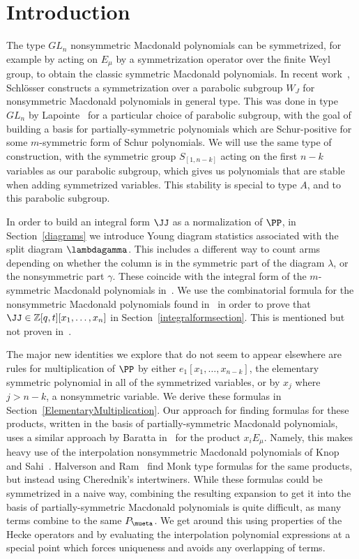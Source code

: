 \section{Introduction}
The type $GL_n$ nonsymmetric Macdonald polynomials can be symmetrized, for example by acting on $E_\mu$ by a symmetrization operator over the finite Weyl group, to obtain the classic symmetric Macdonald polynomials. In recent work~\cite{Schlosser}, Schl\"{o}sser constructs a symmetrization over a parabolic subgroup $W_J$ for nonsymmetric Macdonald polynomials in general type. This was done in type $GL_n$ by Lapointe~\cite{Lapointe} for a particular choice of parabolic subgroup, with the goal of building a basis for partially-symmetric polynomials which are Schur-positive for some $m$-symmetric form of Schur polynomials. We will use the same type of construction, with the symmetric group $S_{[1,n-k]}$ acting on the first $n-k$ variables as our parabolic subgroup, which gives us polynomials that are stable when adding symmetrized variables. This stability is special to type $A$, and to this parabolic subgroup.

In order to build an integral form $\JJ$ as a normalization of $\PP$, in Section~\ref{diagrams} we introduce Young diagram statistics associated with the split diagram $\lambdagamma$. This includes a different way to count arms depending on whether the column is in the symmetric part of the diagram $\lambda$, or the nonsymmetric part $\gamma$. These coincide with the integral form of the $m$-symmetric Macdonald polynomials in~\cite{Lapointe}. We use the combinatorial formula for the nonsymmetric Macdonald polynomials found in~\cite{MR2405160} in order to prove that $\JJ \in \mathbb{Z}[q,t][x_1, \dotsc, x_n]$ in Section~\ref{integralformsection}. This is mentioned but not proven in~\cite{Lapointe}.

The major new identities we explore that do not seem to appear elsewhere are rules for multiplication of $\PP$ by either $e_1[x_1, \dotsc, x_{n-k}]$, the elementary symmetric polynomial in all of the symmetrized variables, or by $x_j$ where $j>n-k$, a nonsymmetric variable. We derive these formulas in Section~\ref{ElementaryMultiplication}. Our approach for finding formulas for these products, written in the basis of partially-symmetric Macdonald polynomials, uses a similar approach by Baratta in~\cite{MR2525842} for the product $x_i E_\mu$. Namely, this makes heavy use of the interpolation nonsymmetric Macdonald polynomials of Knop~\cite{MR1456318} and Sahi~\cite{MR1399411}. Halverson and Ram~\cite{MR4756478} find Monk type formulas for the same products, but instead using Cherednik's intertwiners. While these formulas could be symmetrized in a naive way, combining the resulting expansion to get it into the basis of partially-symmetric Macdonald polynomials is quite difficult, as many terms combine to the same $P_{\mueta}$. We get around this using properties of the Hecke operators and by evaluating the interpolation polynomial expressions at a special point which forces uniqueness and avoids any overlapping of terms.

